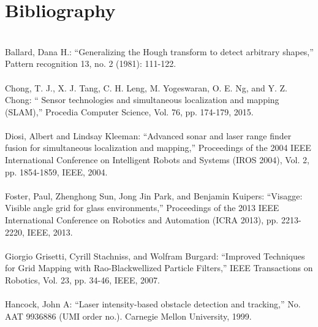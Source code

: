 \chapter*{Bibliography}
\lhead[Bibliography]{}

\thispagestyle{empty}

\newpage

\begin{mythebibliography}{}
\leavevmode \\
Ballard, Dana H.:
\newblock ``Generalizing the Hough transform to detect arbitrary shapes,''
\newblock Pattern recognition 13, no. 2 (1981): 111-122.
\\

\leavevmode \\
Chong, T. J., X. J. Tang, C. H. Leng, M. Yogeswaran, O. E. Ng, and Y. Z. Chong:
\newblock `` Sensor technologies and simultaneous localization and mapping (SLAM),''
\newblock Procedia Computer Science, Vol. 76, pp. 174-179, 2015.
\\ 

\leavevmode \\
Diosi, Albert and Lindsay Kleeman:
\newblock ``Advanced sonar and laser range finder fusion for simultaneous localization and mapping,''
\newblock Proceedings of the 2004 IEEE International Conference on Intelligent Robots and Systems (IROS 2004), Vol. 2, pp. 1854-1859, IEEE, 2004.
\\ 
	
\leavevmode \\
Foster, Paul, Zhenghong Sun, Jong Jin Park, and Benjamin Kuipers:
\newblock ``Visagge: Visible angle grid for glass environments,''
\newblock Proceedings of the 2013 IEEE International Conference on Robotics and Automation (ICRA 2013), pp. 2213-2220, IEEE, 2013.
\\ 
 
\leavevmode \\
Giorgio Grisetti, Cyrill Stachniss, and Wolfram Burgard:
\newblock ``Improved Techniques for Grid Mapping with Rao-Blackwellized Particle Filters,''
\newblock IEEE Transactions on Robotics, Vol. 23, pp. 34-46, IEEE, 2007.
\\ 
 
\leavevmode \\
Hancock, John A:
\newblock ``Laser intensity-based obstacle detection and tracking,''
\newblock No. AAT 9936886 (UMI order no.). Carnegie Mellon University, 1999.
\\ 


\end{mythebibliography}
